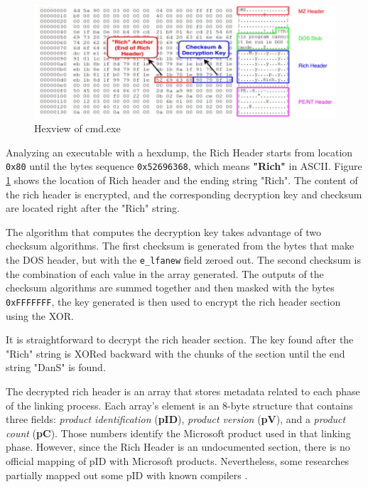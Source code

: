 \begin{figure}[!h]
	\centering
	\includegraphics[width=1.0\columnwidth]{cmd.png}
	\caption{Hexview of cmd.exe}
	\label{fig:cmd}
\end{figure}

Analyzing an executable with a hexdump, the Rich Header starts from location \texttt{0x80} until the bytes sequence \texttt{0x52696368}, which means \textbf{"Rich"} in ASCII. Figure \ref{fig:cmd} shows the location of Rich header and the ending string "Rich". The content of the rich header is encrypted, and the corresponding decryption key and checksum are located right after the "Rich" string. 

The algorithm that computes the decryption key takes advantage of two checksum algorithms. The first checksum is generated from the bytes that make the DOS header, but with the \texttt{e\_lfanew} field zeroed out\cite{richHeaderHunting}. The second checksum is the combination of each value in the array generated. The outputs of the checksum algorithms are summed together and then masked with the bytes \texttt{0xFFFFFFF}, the key generated is then used to encrypt the rich header section using the XOR.

It is straightforward to decrypt the rich header section. The key found after the "Rich" string is XORed backward with the chunks of the section until the end string "DanS" is found.  

The decrypted rich header is an array that stores metadata related to each phase of the linking process. Each array's element is an 8-byte structure that contains three fields: \textit{product identification} (\textbf{pID}), \textit{product version} (\textbf{pV}), and a \textit{product count} (\textbf{pC}). Those numbers identify the Microsoft product used in that linking phase. However, since the Rich Header is an undocumented section, there is no official mapping of pID with Microsoft products. Nevertheless, some researches partially mapped out some pID with known compilers \cite{richGit}.

